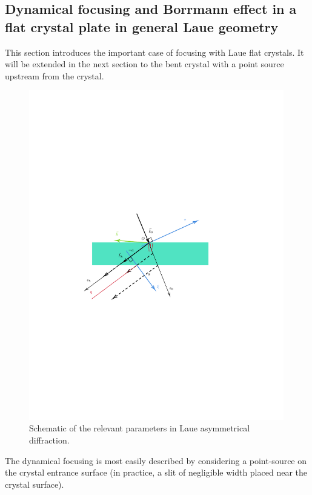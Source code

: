 \documentclass[preprint]{iucr}              %
\newcommand{\inblue}[1]{{\color{black}#1}}
\begin{document}
\subsection{Dynamical focusing and Borrmann effect in a flat crystal plate in general Laue geometry}
\label{sec:LaueFlat}

\inblue{This section introduces the important case of focusing with Laue flat crystals. It will be extended in the next section to the bent crystal with a point source upstream from the crystal.}

\begin{figure}
\label{fig:laue}
\caption{Schematic of the relevant parameters in Laue asymmetrical diffraction.
}
\includegraphics[width=0.99\textwidth,trim=3cm 10cm 5cm 10cm,clip=true]{fig3.pdf}
\end{figure}

The dynamical focusing is most easily described by considering a point-source on the crystal entrance surface (in practice, a slit of negligible width placed near the crystal surface). 
\end{document}
